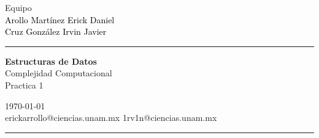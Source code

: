 \documentclass[a4paper,10pt]{article}
\begin{document}
\fancyhead[C]{}
\begin{minipage}{0.295\textwidth} 
\raggedright
Equipo\\    
\footnotesize 
\colorbox[rgb]{0.64, 0.87, 0.93}{\textcolor{black}{Arollo Martínez Erick Daniel}}
\\\colorbox[rgb]{0.69, 0.61, 0.85}{\textcolor{black}{Cruz González Irvin Javier}}
\textcolor[rgb]{0.91, 1.0, 1.0}{\medskip\hrule}
\end{minipage}
\begin{minipage}{0.4\textwidth} 
\centering 
\large 
\textbf{Estructuras de Datos }\\ 
\normalsize 
Complejidad Computacional\\
Practica 1
\end{minipage}
\begin{minipage}{0.295\textwidth} 
\raggedleft
\today\\ 
\footnotesize
erickarrollo@ciencias.unam.mx
1rv1n@ciencias.unam.mx
\textcolor[rgb]{0.91, 1.0, 1.0}{\medskip\hrule}
\end{minipage}

\begin{enumerate}


\end{enumerate}
\end{document}
